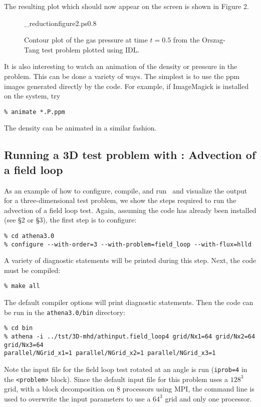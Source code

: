 The resulting plot which should now appear on the screen is shown in Figure 2. 

\begin{figure}[htb!]
\plotone_reduction{figure2.ps}{0.8}
\caption{Contour plot of the gas pressure at time $t=0.5$ from
the Orszag-Tang test problem plotted using IDL.}
\end{figure}

It is also interesting to watch an animation of the density or
pressure in the problem.
This can be done a variety of ways.  The simplest is to use the ppm
images generated directly by the code.
For example, if ImageMagick is
installed on the system, try
\begin{verbatim}
% animate *.P.ppm
\end{verbatim}
The density can be animated in a similar fashion.

\subsection{Running a 3D test problem with \ath: Advection of a field loop}

As an example of how to configure, compile, and run \ath\ and visualize
the output for a three-dimensional test problem, we show the steps required 
to run the advection of a field loop test.
Again, assuming the code has already been
installed (see \S2 or \S3), the first step is to configure:
\begin{verbatim}
% cd athena3.0
% configure --with-order=3 --with-problem=field_loop --with-flux=hlld
\end{verbatim}
A variety of diagnostic statements will be printed during
this step.  Next, the code must be compiled:
\begin{verbatim}
% make all
\end{verbatim}
The default compiler options will print diagnostic statements.  Then
the code can be run in the {\tt athena3.0/bin} directory: 
\begin{verbatim}
% cd bin
% athena -i ../tst/3D-mhd/athinput.field_loop4 grid/Nx1=64 grid/Nx2=64 grid/Nx3=64
parallel/NGrid_x1=1 parallel/NGrid_x2=1 parallel/NGrid_x3=1
\end{verbatim}
Note the input file for the field loop test rotated at an angle is run
({\tt iprob=4} in the {\tt <problem>} block).  Since the
default input file for this problem uses a $128^3$ grid, with a block
decomposition on 8 processors using MPI, the command line is used to overwrite
the input parameters to use a $64^3$ grid and only one processor.

